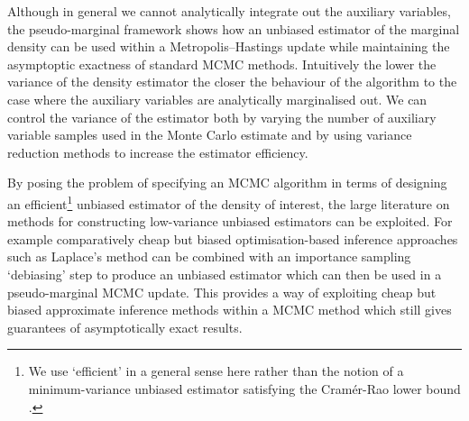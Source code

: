 Although in general we cannot analytically integrate out the auxiliary variables, the pseudo-marginal framework shows how an unbiased estimator of the marginal density can be used within a Metropolis--Hastings update while maintaining the asymptoptic exactness of standard \ac{MCMC} methods.  Intuitively the lower the variance of the density estimator the closer the behaviour of the algorithm to the case where the auxiliary variables are analytically marginalised out. We can control the variance of the estimator both by varying the number of auxiliary variable samples used in the Monte Carlo estimate and by using variance reduction methods to increase the estimator efficiency.



By posing the problem of specifying an \ac{MCMC} algorithm in terms of designing an efficient\footnote{We use `efficient' in a general sense here rather than the notion of a minimum-variance unbiased estimator satisfying the Cram\'{e}r-Rao lower bound \citep{rao1992information,cramer2016mathematical}.} unbiased estimator of the density of interest, the large literature on methods for constructing low-variance unbiased estimators can be exploited. For example comparatively cheap but biased optimisation-based inference approaches such as Laplace's method can be combined with an importance sampling `debiasing' step to produce an unbiased estimator which can then be used in a pseudo-marginal \ac{MCMC} update. This provides a way of exploiting cheap but biased approximate inference methods within a \ac{MCMC} method which still gives guarantees of asymptotically exact results.

